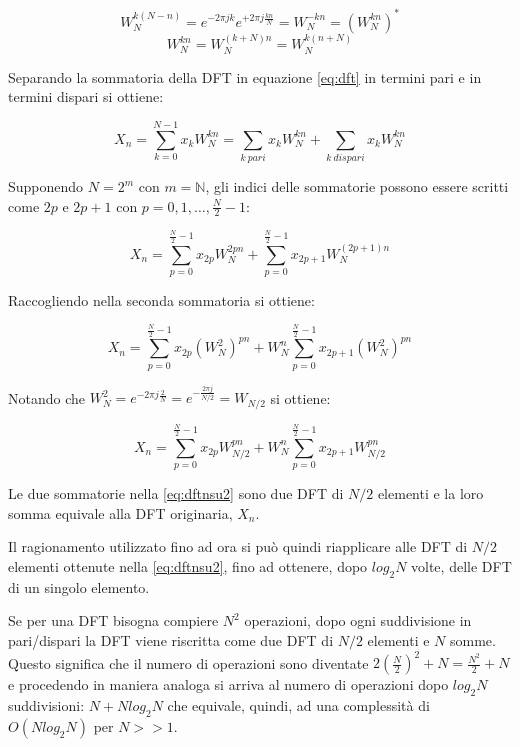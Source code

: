 \begin{equation}
    W_N^{k(N-n)} = e^{-2\pi jk}e^{+2\pi j\frac{kn}{N}} = W_N^{-kn} = (W_N^{kn})^\ast
\end{equation}
\begin{equation}
    W_N^{kn} = W_N^{(k+N)n} = W_N^{k(n+N)}
    \label{eq:wnperiodica}
\end{equation}

Separando la sommatoria della DFT in equazione \ref{eq:dft} in termini pari e in termini dispari si ottiene:

\begin{equation}
    X_n = \displaystyle\sum_{k=0}^{N-1}x_k W_N^{kn} = \displaystyle\sum_{k\ pari}x_k W_N^{kn} + \displaystyle\sum_{k\ dispari}x_k W_N^{kn}
\end{equation}

Supponendo $N=2^m$ con $m=\mathbb{N}$, gli indici delle sommatorie possono essere scritti come $2p$ e $2p+1$ con $p=0,1,\dots,\frac{N}{2}-1$:

\begin{equation}
    X_n = \displaystyle\sum_{p=0}^{\frac{N}{2}-1}x_{2p} W_N^{2pn} + \displaystyle\sum_{p=0}^{\frac{N}{2}-1}x_{2p+1} W_N^{(2p+1)n}
\end{equation}

Raccogliendo nella seconda sommatoria si ottiene:

\begin{equation}
    X_n = \displaystyle\sum_{p=0}^{\frac{N}{2}-1}x_{2p} (W_N^2)^{pn} + W_N^{n}\displaystyle\sum_{p=0}^{\frac{N}{2}-1}x_{2p+1} (W_N^2)^{pn}
\end{equation}

Notando che $W_N^2 = e^{-2\pi j\frac{2}{N}} = e^{-\frac{2\pi j}{N/2}} = W_{N/2}$ si ottiene:

\begin{equation}
    X_n = \displaystyle\sum_{p=0}^{\frac{N}{2}-1}x_{2p} W_{N/2}^{pn} + W_N^{n}\displaystyle\sum_{p=0}^{\frac{N}{2}-1}x_{2p+1} W_{N/2}^{pn}
    \label{eq:dftnsu2}
\end{equation}

Le due sommatorie nella \ref{eq:dftnsu2} sono due DFT di ${N/2}$ elementi e la loro somma equivale alla DFT originaria, $X_n$.

Il ragionamento utilizzato fino ad ora si può quindi riapplicare alle DFT di $N/2$ elementi ottenute nella \ref{eq:dftnsu2}, fino ad ottenere, dopo $log_2 N$ volte, delle DFT di un singolo elemento.

Se per una DFT bisogna compiere $N^2$ operazioni, dopo ogni suddivisione in pari/dispari la DFT viene riscritta come due DFT di $N/2$ elementi e $N$ somme. Questo significa che il numero di operazioni sono diventate $2(\frac{N}{2})^2 + N = \frac{N^2}{2}+N$ e procedendo in maniera analoga si arriva al numero di operazioni dopo $log_2 N$ suddivisioni: $N + Nlog_2 N$ che equivale, quindi, ad una complessità di $O(Nlog_2 N)$ per $N >> 1$.


